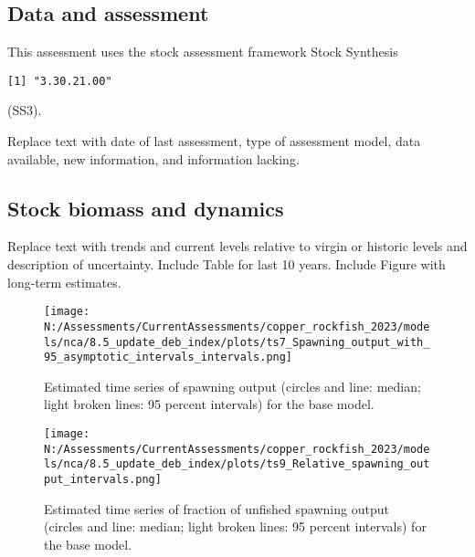 \documentclass[11pt,
  english,
  letterpaper,
]{article}
\begin{document}
\hypertarget{data-and-assessment}{%
\subsection*{Data and assessment}\label{data-and-assessment}}

This assessment uses the stock assessment framework Stock Synthesis

\begin{verbatim}
[1] "3.30.21.00"
\end{verbatim}

(SS3).

Replace text with date of last assessment, type of assessment model, data available, new information, and information lacking.

\hypertarget{stock-biomass-and-dynamics}{%
\subsection*{Stock biomass and dynamics}\label{stock-biomass-and-dynamics}}

Replace text with trends and current levels relative to virgin or historic levels and description of uncertainty. Include Table for last 10 years. Include Figure with long-term estimates.



\begin{figure}
\centering
\texttt{[image: N:/Assessments/CurrentAssessments/copper\_rockfish\_2023/models/nca/8.5\_update\_deb\_index/plots/ts7\_Spawning\_output\_with\_95\_asymptotic\_intervals\_intervals.png]}
\caption{Estimated time series of spawning output (circles and line: median; light broken lines: 95 percent intervals) for the base model.\label{fig:es-sb}}
\end{figure}

\begin{figure}
\centering
\texttt{[image: N:/Assessments/CurrentAssessments/copper\_rockfish\_2023/models/nca/8.5\_update\_deb\_index/plots/ts9\_Relative\_spawning\_output\_intervals.png]}
\caption{Estimated time series of fraction of unfished spawning output (circles and line: median; light broken lines: 95 percent intervals) for the base model.\label{fig:es-depl}}
\end{figure}

\clearpage
\end{document}
